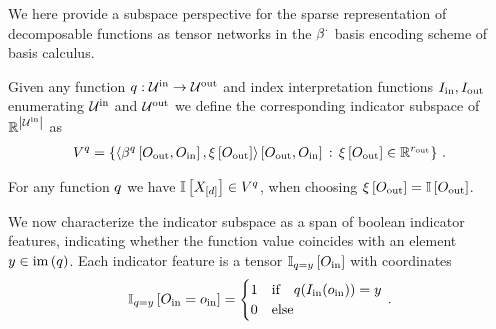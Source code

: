 \label{sec:indicatorFeatures}

We here provide a subspace perspective for the sparse representation of decomposable functions as tensor networks in the $\beta^{\cdot}$ basis encoding scheme of basis calculus.

\begin{definition}
    Given any function $q:\mathcal{U}^{\mathrm{in}}\rightarrow\mathcal{U}^{\mathrm{out}}$ and index interpretation functions $I_{\mathrm{in}},I_{\mathrm{out}}$ enumerating $\mathcal{U}^{\mathrm{in}}$ and $\mathcal{U}^{\mathrm{out}}$ we define the corresponding indicator subspace of $\mathbb{R}^{\left|\mathcal{U}^{\mathrm{in}}\right|}$ as
    \begin{align*}
        V^{q}
        = \left\{ \left\langle 
            \beta^{q}\left[O_{\mathrm{out}},O_{\mathrm{in}}\right],\xi\left[O_{\mathrm{out}}\right]
        \right\rangle \left[ O_{\mathrm{out}},O_{\mathrm{in}} \right] \,:\, \xi\left[O_{\mathrm{out}}\right] \in \mathbb{R}^{r_{\mathrm{out}}}
        \right\} \, .
    \end{align*}
\end{definition}

For any function $q$ we have $\mathbb{I}\left[X_{[d]}\right]\in V^{q}$, when choosing $\xi\left[O_{\mathrm{out}}\right]=\mathbb{I}\left[O_{\mathrm{out}}\right]$.

We now characterize the indicator subspace as a span of boolean indicator features, indicating whether the function value coincides with an element $y\in\mathrm{im}\left(q\right)$.
Each indicator feature is a tensor $\mathbb{I}_{q=y}\left[O_{\mathrm{in}}\right]$ with coordinates
\begin{align*}
    \mathbb{I}_{q=y}\left[O_{\mathrm{in}}=o_{\mathrm{in}}\right]
    = \begin{cases}
          1 & \text{if}\quad q(I_{\mathrm{in}}(o_{\mathrm{in}}))=y \\
          0 & \text{else}
    \end{cases} \, .
\end{align*}

